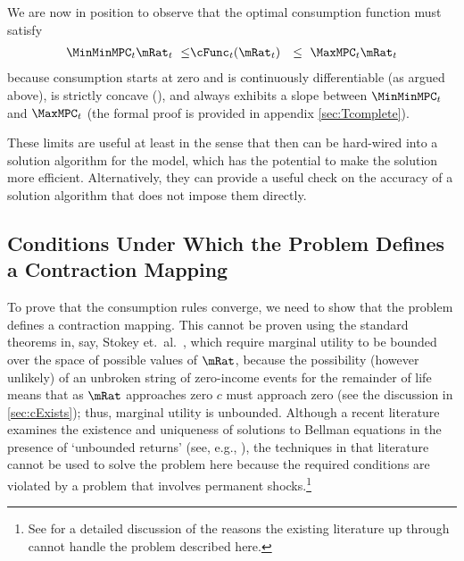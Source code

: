 \documentclass[titlepage]{\econtex}\providecommand{\texname}{BufferStockTheory}%
\begin{document}
We are now in position to observe that the optimal consumption function must satisfy
\begin{eqnarray}
  \MinMinMPC_{t} \mRat_{t} ~ \leq &   \cFunc_{t}(\mRat_{t}) & \leq  ~ \MaxMPC_{t} \mRat_{t} \label{eq:cBounds}
\end{eqnarray}
because consumption starts at zero and is continuously
differentiable (as argued above), is strictly
concave (\cite{ckConcavity}), and always exhibits a
slope between $\MinMinMPC_{t}$ and $\MaxMPC_{t}$ (the formal proof is provided in appendix \ref{sec:Tcomplete}).


These limits are useful at least in the sense that then can be hard-wired into a
solution algorithm for the model, which has the potential to make the solution
more efficient.  Alternatively, they can provide a useful check on the accuracy of
a solution algorithm that does not impose them directly.

\begin{comment}
If the FHWC does not hold, we make do with a less useful bound on the minimal MPC: It is
weakly greater than zero, which follows from the logic in
\ref{sec:cExists}; hence the `max' in \eqref{eq:MinMinMPCDef}.
\end{comment}


\subsection{Conditions Under Which the Problem Defines a Contraction Mapping}

\label{subsec:contraction}

To prove that the consumption rules converge, we need to show that the
problem defines a contraction mapping. This cannot be proven using the
standard theorems in, say, Stokey et.\ al.~\citeyearpar{slpMethods},
which require marginal utility to be bounded over the space of
possible values of $\mRat$, because the possibility (however unlikely)
of an unbroken string of zero-income events for the remainder of life
means that as $\mRat$ approaches zero $c$ must approach zero (see the
discussion in \ref{sec:cExists}); thus, marginal utility is unbounded.
Although a recent literature examines the existence and uniqueness 
of solutions to Bellman equations in the presence of `unbounded returns' (see, e.g.,
\cite{mnUnique}), the techniques in that literature
cannot be used to solve the problem here because the required conditions 
are violated by a problem that involves permanent shocks.\footnote{See \cite{yaoNote}
for a detailed discussion of the reasons the existing literature up through \cite{mnUnique} cannot handle 
the problem described here.}
\end{document}
